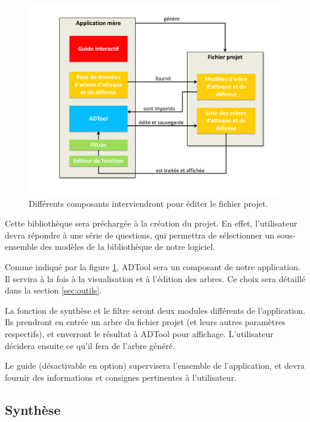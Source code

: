         \begin{figure}
            \begin{center}
                \includegraphics[width=1\textwidth]{figure/archi.pdf}
            \end{center}
            \caption{Différents composants interviendront pour éditer le fichier projet.}
            \label{fig:archi}
        \end{figure}

        Cette bibliothèque sera préchargée à la création du projet. En effet, l'utilisateur devra répondre à une série de questions, qui permettra de sélectionner un sous-ensemble des modèles de la bibliothèque de notre logiciel.

        Comme indiqué par la figure \ref{fig:archi}, ADTool sera un composant de notre application. Il servira à la fois à la visualisation et à l'édition des arbres. Ce choix sera détaillé dans la section \ref{sec:outils}.

        La fonction de synthèse et le filtre seront deux modules différents de l'application. Ils prendront en entrée un arbre du fichier projet (et leurs autres paramètres respectifs), et enverront le résultat à ADTool pour affichage. L'utilisateur décidera ensuite ce qu'il fera de l'arbre généré.

        Le guide (désactivable en option) supervisera l'ensemble de l'application, et devra fournir des informations et consignes pertinentes à l'utilisateur.

    \subsection{Synthèse}
        \label{sec:cahier_synthese}